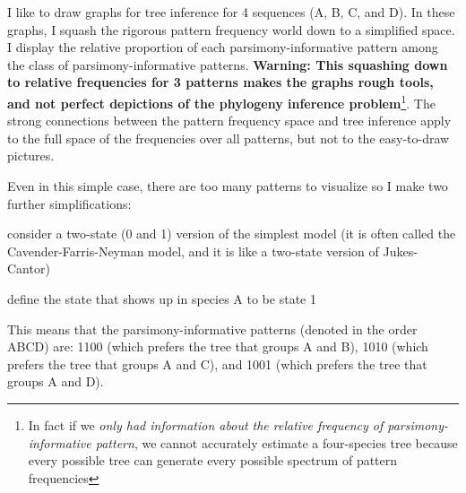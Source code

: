 \documentclass[11pt]{article}
\begin{document}
I like to draw graphs for tree inference for 4 sequences (A, B, C, and D).
In these graphs, I squash the rigorous pattern frequency world down to a simplified space.
I display the relative proportion of each parsimony-informative pattern among the class of parsimony-informative patterns.
{\bf Warning: This squashing down to relative frequencies for 3 patterns makes the graphs rough tools, and not perfect depictions of the phylogeny inference problem}\footnote{In fact if we {\em only had information about the relative frequency of parsimony-informative pattern}, we cannot accurately estimate a four-species tree because every possible tree can generate every possible spectrum of pattern frequencies\citep{AllmanHR2010}}. 
The strong connections between the pattern frequency space and tree inference apply to the full space of the frequencies over all patterns, but not to the easy-to-draw pictures.

Even in this simple case, there are too many patterns to visualize so I make two further simplifications:
\begin{compactitem}
	\item consider a two-state (0 and 1) version of the simplest model (it is often called the Cavender-Farris-Neyman model, and it is like a two-state version of Jukes-Cantor)
	\item define the state that shows up in species A to be state 1
\end{compactitem}
This means that the parsimony-informative patterns (denoted in the order ABCD) are: 1100 (which prefers the tree that groups A and B), 1010 (which prefers the tree that groups A and C), and 1001 (which prefers the tree that groups A and D).
\end{document}

